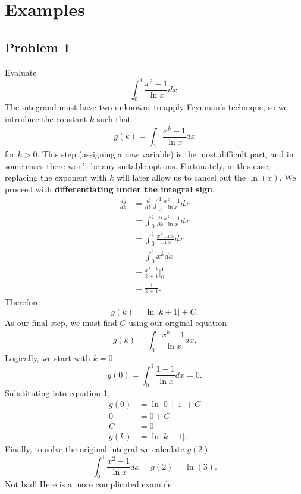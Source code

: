 \documentclass{article}
\begin{document}
\section*{Examples}
\subsection*{Problem 1}
Evaluate $$\int_{0}^{1}\frac{x^2-1}{\ln{x}}dx.$$
The integrand must have two unknowns to apply Feynman's technique, so we introduce the constant $k$ such that
\begin{equation}
    g(k) = \int_{0}^{1}\frac{x^k-1}{\ln{x}}dx
\end{equation} for $k>0$. This step (assigning a new variable) is the most difficult part, and in some cases there won't be any suitable options. Fortunately, in this case, replacing the exponent with $k$ will later allow us to cancel out the $\ln(x).$
\newline We proceed with \textbf{differentiating under the integral sign}.
\begin{equation*}
    \begin{split}
        \frac{dg}{dk} &= \frac{d}{dk}\int_{0}^{1}\frac{x^k-1}{\ln{x}}dx \\
        &= \int_{0}^{1}\frac{\partial}{\partial k}\frac{x^k-1}{\ln{x}}dx \\
        &= \int_{0}^{1}\frac{x^k\ln{x}}{\ln{x}}dx \\
        &= \int_{0}^{1}x^kdx \\
        &= \frac{x^{k+1}}{k+1}\bigg\vert_{0}^{1} \\
        &= \frac{1}{k+1}.
    \end{split}
\end{equation*}
Therefore $$g(k)=\ln{|k+1|}+C.$$
As our final step, we must find $C$ using our original equation $$g(k) = \int_{0}^{1}\frac{x^k-1}{\ln{x}}dx.$$ Logically, we start with $k=0$. 
$$g(0)=\int_{0}^{1}\frac{1-1}{\ln{x}}dx = 0.$$
Substituting into equation 1,
\begin{equation*}
    \begin{split}
        g(0) &= \ln{|0+1|}+C \\
        0 &= 0+C \\
        C &= 0 \\
        g(k) &= \ln{|k+1|}.
    \end{split}
\end{equation*}
Finally, to solve the original integral we calculate $g(2)$.
$$\int_{0}^{1}\frac{x^2-1}{\ln{x}}dx = g(2) = \boxed{\ln({3})}.$$
Not bad! Here is a more complicated example.
\end{document}
